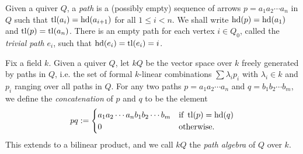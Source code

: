 \iffalse
\begin{definition}
  A \emph{representation} $(V_i, \rho_a)$ of a quiver $Q$ over a
  field $k$ is an assignment of a $k$-vector space $V_i$ for each
  vertex $i \in Q_0$ and a linear map $\rho_a: V_{\hd(a)} \to
  V_{\tl(a)}$ for each arrow $a \in Q_1$.
  A representation is \emph{finite dimensional} if each $V_i$ is so over $k$.
\end{definition}

\begin{definition}
  A \emph{morphism of representations} $\Phi: (V_i, \rho_a) \to (W_i,
  \tau_a)$ of $Q$ consists of a linear map $\varphi_i: V_i \to W_i$
  for each $i \in Q_0$ such that the diagrams
  \[
    \begin{tikzcd}[cramped]
      {V_{\hd(a)}} & {V_{\tl(a)}} \\
      {W_{\hd(a)}} & {W_{\tl(a)}}
      \arrow["{\rho_a}", from=1-1, to=1-2]
      \arrow["{\varphi_{\hd(a)}}"', from=1-1, to=2-1]
      \arrow["{\varphi_{\tl(a)}}", from=1-2, to=2-2]
      \arrow["{\tau_a}"', from=2-1, to=2-2]
    \end{tikzcd}
  \]
  commute for all $a \in Q_1$.
  With composition of morphisms defined in the obvious way, this
  furnishes $\rep{k}{Q}$, the \emph{category of finite dimensional
  representations of $Q$ over $k$}.
\end{definition}

An intimately related notion to the representations of $Q$ over $k$
is its \emph{path algebra} of a quiver over $k$.
This will also clarify the relationship between $\Delta$ and the
tilting sheaf $\shf{T}$.
\fi

\begin{definition}
  Given a quiver $Q$, a \emph{path} is a (possibly empty) sequence of
  arrows $p = a_1 a_2 \cdots a_n$ in $Q$ such that $\operatorname{tl}(a_i) =
  \operatorname{hd}(a_{i + 1})$ for all $1 \leq i < n$.
  We shall write $\operatorname{hd}(p) = \operatorname{hd}(a_1)$ and $\operatorname{tl}(p) = \operatorname{tl}(a_n)$.
  There is an empty path for each vertex $i \in Q_0$, called the
  \emph{trivial path} $e_i$, such that $\operatorname{hd}(e_i) = \operatorname{tl}(e_i) = i$.
\end{definition}

\begin{definition}
  Fix a field $k$.
  Given a quiver $Q$, let $kQ$ be the vector space over $k$ freely
  generated by paths in $Q$, i.e. the set of formal $k$-linear
  combinations $\sum \lambda_i p_i$ with $\lambda_i \in k$ and $p_i$
  ranging over all paths in $Q$.
  For any two paths $p = a_1 a_2 \cdots a_n$ and $q = b_1 b_2 \cdots
  b_m$, we define the \emph{concatenation} of $p$ and $q$ to be the element
  \[
    pq :=
    \begin{cases}
      a_1 a_2 \cdots a_n b_1 b_2 \cdots b_m & \text{if } \operatorname{tl}(p) = \operatorname{hd}(q) \\
      0 & \text{otherwise.}
    \end{cases}
  \]
  This extends to a bilinear product, and we call $kQ$ the \emph{path
  algebra} of $Q$ over $k$.
\end{definition}

